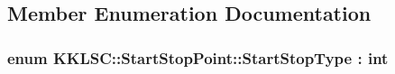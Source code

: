 \subsection{Member Enumeration Documentation}
\subsubsection[{\texorpdfstring{Start\+Stop\+Type}{StartStopType}}]{\setlength{\rightskip}{0pt plus 5cm}enum {\bf K\+K\+L\+S\+C\+::\+Start\+Stop\+Point\+::\+Start\+Stop\+Type} \+: int\hspace{0.3cm}{\ttfamily [strong]}}\hypertarget{class_k_k_l_s_c_1_1_start_stop_point_aca5818602fc58bfe4c9794b311288680}{}\label{class_k_k_l_s_c_1_1_start_stop_point_aca5818602fc58bfe4c9794b311288680}
